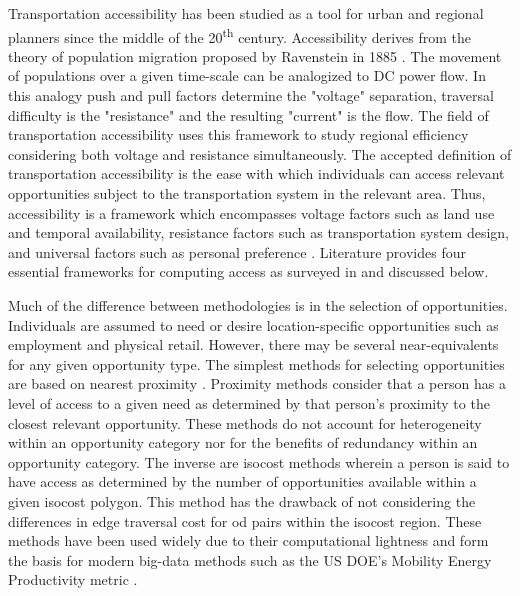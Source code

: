 \documentclass[11pt]{article}
\begin{document}
\begin{multicols}{2}
Transportation accessibility has been studied as a tool for urban and regional planners since the middle of the 20\textsuperscript{th} century. Accessibility derives from the theory of population migration proposed by Ravenstein in 1885 \cite{Ravenstein_1885}. The movement of populations over a given time-scale can be analogized to DC power flow. In this analogy push and pull factors determine the "voltage" separation, traversal difficulty is the "resistance" and the resulting "current" is the flow. The field of transportation accessibility uses this framework to study regional efficiency considering both voltage and resistance simultaneously. The accepted definition of transportation accessibility is the ease with which individuals can access relevant opportunities subject to the transportation system in the relevant area. Thus, accessibility is a framework which encompasses voltage factors such as land use and temporal availability, resistance factors such as transportation system design, and universal factors such as personal preference \cite{Geurs_2004}. Literature provides four essential frameworks for computing access as surveyed in \cite{Handy_1997, Kwan_1998, Geurs_2004, Miller_2018, Handy_2020} and discussed below.

Much of the difference between methodologies is in the selection of opportunities. Individuals are assumed to need or desire location-specific opportunities such as employment and physical retail. However, there may be several near-equivalents for any given opportunity type. The simplest methods for selecting opportunities are based on nearest proximity \cite{Wachs_1973, Vickerman_1974}. Proximity methods consider that a person has a level of access to a given need as determined by that person's proximity to the closest relevant opportunity. These methods do not account for heterogeneity within an opportunity category nor for the benefits of redundancy within an opportunity category. The inverse are isocost methods wherein a person is said to have access as determined by the number of opportunities available within a given isocost polygon. This method has the drawback of not considering the differences in edge traversal cost for \gls{od} pairs within the isocost region. These methods have been used widely \cite{Easa_1993} due to their computational lightness and form the basis for modern big-data methods such as the US DOE's Mobility Energy Productivity metric \cite{Hou_2019}.


\end{multicols}
\end{document}
